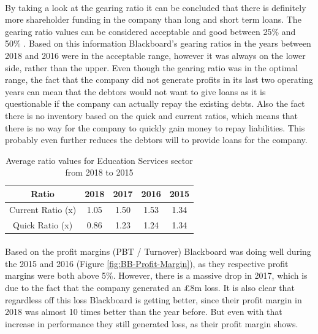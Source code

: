 \documentclass[]{article}
\begin{document}
\paragraph{}
By taking a look at the gearing ratio it can be concluded that there is definitely more shareholder funding in the company than long and short term loans. The gearing ratio values can be considered acceptable and good between 25\% and 50\% \cite{Investopedia-Gearing}. Based on this information Blackboard's gearing ratios in the years between 2018 and 2016 were in the acceptable range, however it was always on the lower side, rather than the upper. Even though the gearing ratio was in the optimal range, the fact that the company did not generate profits in its last two operating years can mean that the debtors would not want to give loans as it is questionable if the company can actually repay the existing debts. Also the fact there is no inventory based on the quick and current ratios, which means that there is no way for the company to quickly gain money to repay liabilities. This probably even further reduces the debtors will to provide loans for the company.


\begin{table}
\centering
\begin{tabular}{||c | c | c | c | c||} 
\hline
Ratio & 2018 & 2017 & 2016 & 2015 \\ [0.5ex] 
\hline\hline
Current Ratio (x) & 1.05 & 1.50 & 1.53 & 1.34 \\ 
\hline
Quick Ratio (x) & 0.86 & 1.23 & 1.24 & 1.34 \\ 
\hline
\end{tabular}
\caption{Average ratio values for Education Services sector from 2018 to 2015 \cite{Ready-Ratios-Education}}
\label{tab:Ratios-EDSec}
\end{table}


\paragraph{}
Based on the profit margins (PBT / Turnover) Blackboard was doing well during the 2015 and 2016 (Figure \ref{fig:BB-Profit-Margin}), as they respective profit margins were both above 5\%. However, there is a massive drop in 2017, which is due to the fact that the company generated an £8m loss. It is also clear that regardless off this loss Blackboard is getting better, since their profit margin in 2018 was almost 10 times better than the year before. But even with that increase in performance they still generated loss, as their profit margin shows. 
\end{document}
